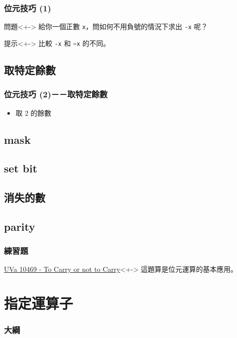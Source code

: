 \documentclass[utf8]{beamer}
\begin{document}
\begin{CJK}{UTF8}{bkai}
\begin{frame}[fragile]
  \frametitle{位元技巧 (1)}
  \begin{alertblock}{問題}<+->
  給你一個正數 \lstinline{x}{}，問如何不用負號的情況下求出 \lstinline{-x}{} 呢？
  \end{alertblock}
  \begin{block}{提示}<+->
  比較 \lstinline{-x}{} 和 \lstinline{~x}{} 的不同。
  \end{block}
\end{frame}

\subsection{取特定餘數}

\begin{frame}[fragile]
  \frametitle{位元技巧 (2)－－取特定餘數}
  \begin{itemize}[<+->]
  \item 取 2 的餘數
  \end{itemize}
\end{frame}

\subsection{mask}

\subsection{set bit}

\subsection{消失的數}

\subsection{parity}

\begin{frame}
  \frametitle{練習題}
  \begin{exampleblock}{\href{http://unfortunate-dog.github.io/articles/104/p10469/}{UVa 10469 - To Carry or not to Carry}}<+->
  \label{uva:10469}
  這題算是位元運算的基本應用。
  \end{exampleblock}
\end{frame}

\section{指定運算子}
\begin{frame}
  \frametitle{大綱}
  \begin{multicols}{2}
    \tableofcontents[currentsection]
  \end{multicols}
\end{frame}


\end{CJK}
\end{document}
